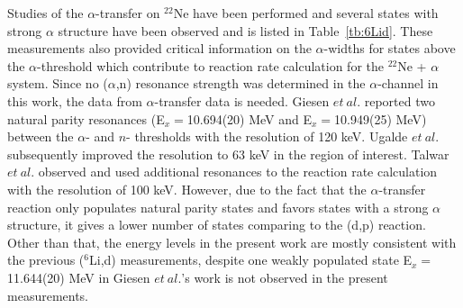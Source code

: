 Studies of the $\alpha$-transfer on $^{22}$Ne have been performed \citep{GIESEN199395}\citep{Ugalde2007}\citep{Rashi2016} and several states with strong $\alpha$ structure have been observed and is listed in Table~\ref{tb:6Lid}. These measurements also provided critical information on the $\alpha$-widths for states above the $\alpha$-threshold which contribute to reaction rate calculation for the $^{22}$Ne + $\alpha$ system. Since no  ($\alpha$,n) resonance strength was determined in the $\alpha$-channel in this work,  the data from $\alpha$-transfer data is needed.  Giesen $et\ al.$\citep{GIESEN199395} reported two natural parity resonances (E$_x=$10.694(20) MeV and E$_x=$10.949(25) MeV) between the  $\alpha$- and $n$- thresholds with the resolution of 120 keV.  Ugalde $et\ al.$\citep{Ugalde2007} subsequently improved the resolution to 63 keV in the region of interest.   Talwar $et\ al.$\citep{Rashi2016} observed and used additional resonances to the reaction rate calculation with the resolution of 100 keV.
However, due to the fact that the $\alpha$-transfer reaction only populates natural parity states and favors states with a strong $\alpha$ structure, it  gives a lower number of states comparing to the (d,p) reaction. Other than that, the energy levels in the present work are mostly consistent with  the previous ($^6$Li,d) measurements, despite one weakly populated state E$_x=$11.644(20) MeV in Giesen $et\ al.$'s work is not observed in the present measurements.



